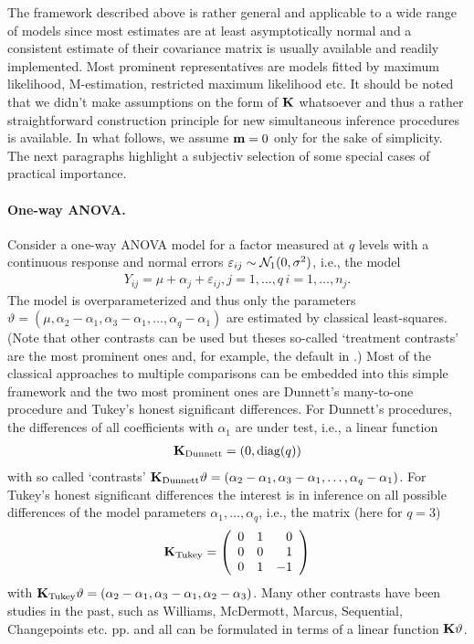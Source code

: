 \documentclass[12pt]{article}
\begin{document}
The framework described above is rather general and applicable 
to a wide range of models since most estimates are at least asymptotically
normal and a consistent estimate of their covariance matrix
is usually available and readily implemented. Most prominent
representatives are models fitted by maximum likelihood, M-estimation,
restricted maximum likelihood etc. 
It should be noted that we didn't make assumptions on the form
of $\mathbf{K}$ whatsoever and thus a rather straightforward construction 
principle for new simultaneous inference procedures is available. In
what follows, we assume $\mathbf{m} = 0$ only for the sake of simplicity.
The next paragraphs highlight a subjectiv selection of 
some special cases of practical importance.

\paragraph{One-way ANOVA.}

Consider a one-way ANOVA model for a factor measured at $q$ levels
with a continuous response and normal errors $\varepsilon_{ij} \sim \mathcal{N}_1(0, \sigma^2)$, 
i.e., the model
\begin{eqnarray*}
Y_{ij} = \mu + \alpha_{j} + \varepsilon_{ij}, j = 1,\dots,q \, i = 1, \dots, n_j.
\end{eqnarray*}
The model is overparameterized and thus only the parameters
$\vartheta = (\mu, \alpha_2 - \alpha_1, \alpha_3 - \alpha_1, \dots, \alpha_q - \alpha_1)$ 
are  estimated by classical least-squares. (Note that other contrasts can be used
but theses so-called `treatment contrasts' are the most prominent ones and,
for example, the default in \RR.) 
Most of the classical approaches
to multiple comparisons can be embedded into this simple framework and 
the two most prominent ones are Dunnett's many-to-one procedure and
Tukey's honest significant differences. For Dunnett's procedures,
the differences of all coefficients with $\alpha_1$ are under test, i.e.,
a linear function
\begin{eqnarray*}
\mathbf{K}_\text{Dunnett} = (0, \text{diag}(q))
\end{eqnarray*}
with so called `contrasts' 
$\mathbf{K}_\text{Dunnett} \vartheta = (\alpha_2 - \alpha_1, \alpha_3 - \alpha_1, \dots, \alpha_q - \alpha_1)$.
For Tukey's honest significant differences the interest is in inference on
all possible differences of the model parameters $\alpha_1, \dots, \alpha_q$, i.e., 
the matrix (here for $q = 3$)
\begin{eqnarray*}
\mathbf{K}_\text{Tukey} = \left( 
\begin{array}{rrr} 0 & 1 & 0 \\
0 & 0 & 1 \\
0 & 1 & -1 
\end{array} \right)
\end{eqnarray*}
with $\mathbf{K}_\text{Tukey} \vartheta = (\alpha_2 - \alpha_1, \alpha_3 - \alpha_1, \alpha_2 - \alpha_3)$.
Many other contrasts have been studies in the past, such as Williams, McDermott, Marcus,
Sequential, Changepoints etc. pp.  and all can be formulated in terms
of a linear function $\mathbf{K} \vartheta$.
\end{document}
